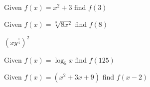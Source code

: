 \item Given $f(x) = x^2+3$ find $f(3)$
\item Given $f(x) = \sqrt[3]{8 x^{2}}$ find $f(8)$
\item $\displaystyle \left( x y^{\frac{1}{4}}\right)^2$
\item Given $f(x) = \log_5 x$ find $f(125)$
\item Given $f(x)=(x^2+3x+9)$ find $f(x-2)$
